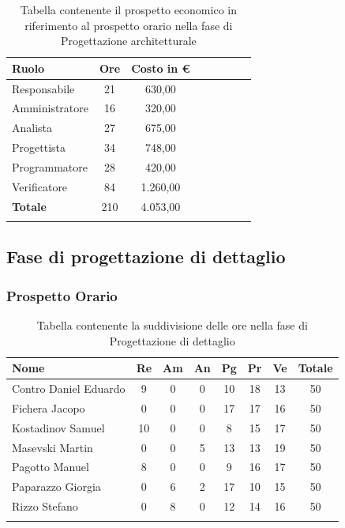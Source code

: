 \documentclass[../piano_di_progetto.tex]{subfiles}
\begin{document}
\begin{center}
	\begin{longtable}{|l|c|c|c|c|c|c|c|}
		\hline
		\rowcolor{lightgray}
		\textbf{Ruolo} & \textbf{Ore} & \textbf{Costo in €}\\

		\hline
		Responsabile & 21 & 630,00\\
		\hline
		Amministratore & 16 & 320,00\\
		\hline
		Analista & 27 & 675,00\\
		\hline
		Progettista & 34 & 748,00\\
		\hline
		Programmatore & 28 & 420,00\\
		\hline
		Verificatore & 84 & 1.260,00\\
		\hline
		\textbf{Totale} & 210 & 4.053,00\\
		\hline
		\caption{Tabella contenente il prospetto economico in riferimento al prospetto orario nella fase di Progettazione architetturale}
	\end{longtable}
\end{center}

\subsection{ Fase di progettazione di dettaglio}%
\label{sub:fase_prog_dett}
\subsubsection{Prospetto Orario}

\begin{center}
	\begin{longtable}{|l|c|c|c|c|c|c|c|}
		\hline
		\rowcolor{lightgray}
		\textbf{Nome} & \textbf{Re} & \textbf{Am} & \textbf{An} & \textbf{Pg}  & \textbf{Pr}   & \textbf{Ve} & \textbf{Totale} \\

		\hline
			Contro Daniel Eduardo & 9 & 0 & 0 & 10 & 18 & 13 & 50 \\
		\hline
			Fichera Jacopo & 0 & 0 & 0 & 17 & 17 & 16 & 50 \\
		\hline
			Kostadinov Samuel & 10 & 0 & 0 & 8 & 15 & 17 & 50 \\			
		\hline
			Masevski Martin & 0 & 0 & 5 & 13 & 13 & 19 & 50 \\
		\hline
			Pagotto Manuel & 8 & 0 & 0 & 9 & 16 & 17 & 50 \\		
		\hline
			Paparazzo Giorgia & 0 & 6 & 2 & 17 & 10 & 15 & 50 \\
		\hline
			Rizzo Stefano & 0 & 8 & 0 & 12 & 14 & 16 & 50 \\
		\hline	

		\caption{Tabella contenente la suddivisione delle ore nella fase di Progettazione di dettaglio}
	\end{longtable}
\end{center}
\end{document}
